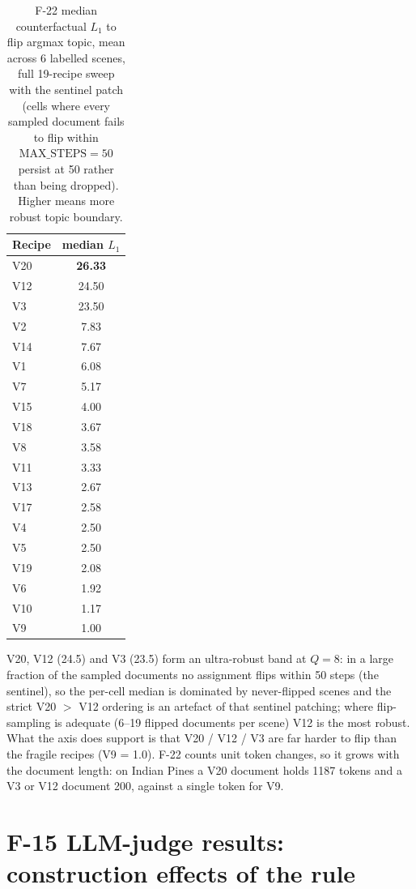 \documentclass[journal,a4paper,10pt]{IEEEtran}
\begin{document}
\begin{table}[ht]
\caption{F-22 median counterfactual $L_1$ to flip argmax topic, mean
across 6 labelled scenes, full 19-recipe sweep with the sentinel patch
(cells where every sampled document fails to flip within
$\text{MAX\_STEPS}=50$ persist at 50 rather than being dropped).
Higher means more robust topic boundary.}
\label{tab:f22-summary}
\centering
\small
\begin{tabular}{lc}
\toprule
Recipe & median $L_1$ \\
\midrule
V20 & \textbf{26.33} \\
V12 & 24.50 \\
V3  & 23.50 \\
V2  & 7.83 \\
V14 & 7.67 \\
V1  & 6.08 \\
V7  & 5.17 \\
V15 & 4.00 \\
V18 & 3.67 \\
V8  & 3.58 \\
V11 & 3.33 \\
V13 & 2.67 \\
V17 & 2.58 \\
V4  & 2.50 \\
V5  & 2.50 \\
V19 & 2.08 \\
V6  & 1.92 \\
V10 & 1.17 \\
V9  & 1.00 \\
\bottomrule
\end{tabular}
\end{table}

V20, V12 (24.5) and V3 (23.5) form an ultra-robust band at $Q=8$: in a
large fraction of the sampled documents no assignment flips within 50
steps (the sentinel), so the per-cell median is dominated by
never-flipped scenes and the strict V20 $>$ V12 ordering is an artefact
of that sentinel patching; where flip-sampling is adequate (6--19 flipped
documents per scene) V12 is the most robust. What the axis does support
is that V20 / V12 / V3 are far harder to flip than the fragile recipes
(V9 = 1.0). F-22 counts unit token changes, so it grows with the
document length: on Indian Pines a V20 document holds 1187 tokens and
a V3 or V12 document 200, against a single token for V9.

\section{F-15 LLM-judge results: construction effects of the rule}
\label{sec:f15}
\end{document}
